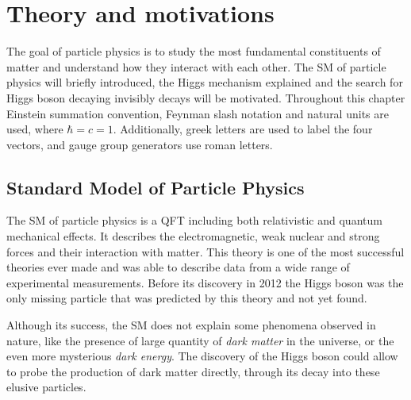 \chapter{Theory and motivations}
\label{CHAPTER:TheoryAndMotivations}

\glsresetall %


The goal of particle physics is to study the most fundamental constituents of matter and understand how they interact with each other. The \gls{SM} of particle physics will briefly introduced, the Higgs mechanism explained and the search for Higgs boson decaying invisibly decays will be motivated. Throughout this chapter Einstein summation convention, Feynman slash notation and natural units are used, where $\hbar=c=1$. Additionally, greek letters are used to label the four vectors, and gauge group generators use roman letters.

\section{Standard Model of Particle Physics}


The \gls{SM} of particle physics is a \gls{QFT} including both relativistic and quantum mechanical effects. It describes the electromagnetic, weak nuclear and strong forces and their interaction with matter. This theory is one of the most successful theories ever made and was able to describe data from a wide range of experimental measurements. Before its discovery in 2012 \cite{ARTICLE:ATLAS_HiggsDiscovery,ARTICLE:CMS_HiggsDiscovery} the Higgs boson was the only missing particle that was predicted by this theory and not yet found. 

Although its success, the \gls{SM} does not explain some phenomena observed in nature, like the presence of large quantity of \textit{dark matter} in the universe, or the even more mysterious \textit{dark energy}. The discovery of the Higgs boson could allow to probe the production of dark matter directly, through its decay into these elusive particles. 

